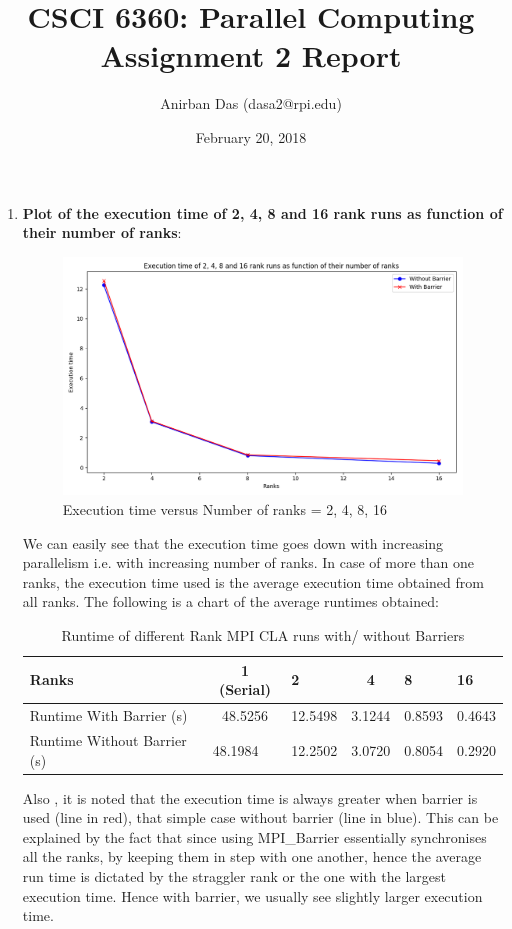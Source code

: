 \documentclass[a4paper,12 pt]{article}
\title{\vspace{-2.0cm}CSCI 6360: Parallel Computing Assignment 2 Report}
\author{Anirban Das (dasa2@rpi.edu) }
\date{February 20, 2018}
\begin{document}
\maketitle

\begin{enumerate}
\item \textbf{Plot of the execution time of 2, 4, 8 and 16 rank runs as function of their number of ranks}:\\
\begin{figure}[H]
	\centering
	\includegraphics[width=.8\linewidth]{Graphs/graph_1.png}
  \caption{Execution time versus Number of ranks = 2, 4, 8, 16}
\end{figure}
We can easily see that the execution time goes down with increasing parallelism i.e. with increasing number of ranks. In case of more than one ranks, the execution time used is the average execution time obtained from all ranks. The following is a chart of the average runtimes obtained:
\begin{table}[]
\centering
\caption{Runtime of different Rank MPI CLA runs with/ without Barriers}
\label{my-label}
\begin{tabular}{|l|c|l|c|l|l|}
\hline
Ranks                       & 1 (Serial)                   & 2       & 4                           & 8      & 16     \\ \hline
Runtime With Barrier (s)    & 48.5256                      & 12.5498 & 3.1244                      & 0.8593 & 0.4643 \\ \hline
Runtime Without Barrier (s) & \multicolumn{1}{l|}{48.1984} & 12.2502 & \multicolumn{1}{l|}{3.0720} & 0.8054 & 0.2920 \\ \hline
\end{tabular}
\end{table}

Also , it is noted that the execution time is always greater when barrier is used (line in red), that simple case without barrier (line in blue). This can be explained by the fact that since using MPI\_Barrier essentially synchronises all the ranks, by keeping them in step with one another, hence the average run time is dictated by the straggler rank or the one with the largest execution time. Hence with barrier, we usually see slightly larger execution time.


\end{enumerate}
\end{document}
